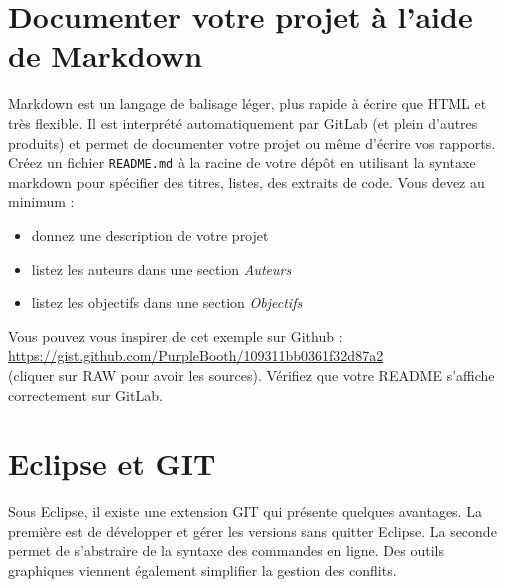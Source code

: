 \documentclass[final, a4paper, openbib, ]{article}
\begin{document}
\section{Documenter votre projet à l'aide de Markdown}

Markdown est un langage de balisage léger, plus rapide à écrire que HTML et très flexible.
Il est interprété automatiquement par GitLab (et plein d'autres produits) et permet de documenter votre projet ou même d'écrire vos rapports.\\

Créez un fichier \texttt{README.md} à la racine de votre dépôt en utilisant la syntaxe markdown pour spécifier des titres, listes, des extraits de code.
Vous devez au minimum :
	\begin{itemize}
	\item donnez une description de votre projet
	\item listez les auteurs dans une section \textit{Auteurs}
	\item listez les objectifs dans une section \textit{Objectifs}\\
	\end{itemize}

Vous pouvez vous inspirer de cet exemple sur Github :\\
\url{https://gist.github.com/PurpleBooth/109311bb0361f32d87a2}\\
(cliquer sur RAW pour avoir les sources).
Vérifiez que votre README s'affiche correctement sur GitLab.



\section{Eclipse et GIT}

Sous Eclipse, il existe une extension GIT qui présente quelques avantages. La première est de développer et gérer les versions sans quitter Eclipse. La seconde permet de s'abstraire de la syntaxe des commandes en ligne. Des outils graphiques viennent également simplifier la gestion des conflits.
\end{document}
